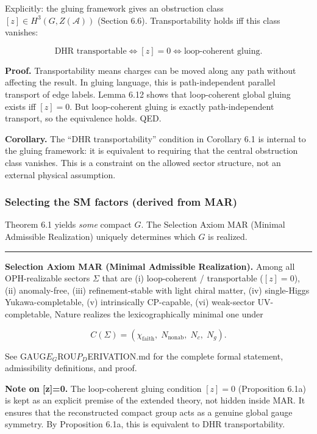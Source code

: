 \documentclass[11pt,a4paper]{article}
\theoremstyle{remark}
\begin{document}
Explicitly: the gluing framework gives an obstruction class
\([z] \in H^3(G, Z(\mathcal{A}))\) (Section 6.6). Transportability holds iff
this class vanishes:

\[
\text{DHR transportable} \iff [z] = 0 \iff \text{loop-coherent gluing}.
\]

\textbf{Proof.} Transportability means charges can be moved along any path
without affecting the result. In gluing language, this is path-independent
parallel transport of edge labels. Lemma 6.12 shows that loop-coherent
global gluing exists iff \([z] = 0\). But loop-coherent gluing is exactly
path-independent transport, so the equivalence holds. QED.

\textbf{Corollary.} The ``DHR transportability'' condition in Corollary 6.1 is
internal to the gluing framework: it is equivalent to requiring that the
central obstruction class vanishes. This is a constraint on the allowed
sector structure, not an external physical assumption.

\subsubsection{Selecting the SM factors (derived from MAR)}\label{selecting-the-sm-factors-derived-from-mar}

Theorem 6.1 yields \emph{some} compact \(G\). The Selection Axiom MAR (Minimal
Admissible Realization) uniquely determines which \(G\) is realized.

\begin{center}\rule{0.5\linewidth}{0.5pt}\end{center}

\textbf{Selection Axiom MAR (Minimal Admissible Realization).} Among all
OPH-realizable sectors \(\Sigma\) that are (i) loop-coherent / transportable
(\([z]=0\)), (ii) anomaly-free, (iii) refinement-stable with light chiral
matter, (iv) single-Higgs Yukawa-completable, (v) intrinsically CP-capable,
(vi) weak-sector UV-completable, Nature realizes the lexicographically
minimal one under

\[C(\Sigma) = (\chi_{\mathrm{faith}},\; N_{\mathrm{nonab}},\; N_c,\; N_g).\]

See GAUG$E_G$ROU$P_D$ERIVATION.md for the complete formal statement, admissibility
definitions, and proof.

\textbf{Note on {[}z{]}=0.} The loop-coherent gluing condition \([z]=0\) (Proposition
6.1a) is kept as an explicit premise of the extended theory, not hidden inside
MAR. It ensures that the reconstructed compact group acts as a genuine global
gauge symmetry. By Proposition 6.1a, this is equivalent to DHR
transportability.
\end{document}
